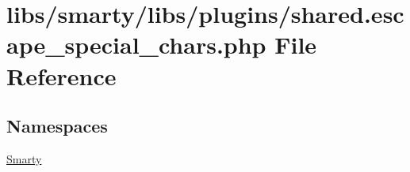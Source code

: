\hypertarget{shared_8escape__special__chars_8php}{}\section{libs/smarty/libs/plugins/shared.escape\+\_\+special\+\_\+chars.\+php File Reference}
\label{shared_8escape__special__chars_8php}
\subsection*{Namespaces}
\begin{DoxyCompactItemize}
\item 
 \hyperlink{namespace_smarty}{Smarty}
\end{DoxyCompactItemize}
